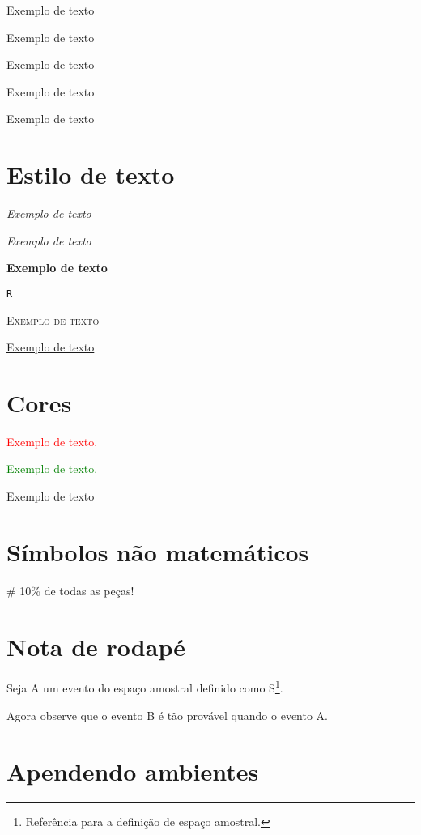 \documentclass{article}
\begin{document}
\tiny
Exemplo de texto

\footnotesize
Exemplo de texto

\Large
Exemplo de texto

\Huge
Exemplo de texto

\normalsize
Exemplo de texto


\section{Estilo de texto}


\emph{Exemplo de texto}

\textit{Exemplo de texto}

\textbf{Exemplo de texto}

\texttt{R}

\textsc{Exemplo de texto}

\uline{Exemplo de texto}


\section{Cores}


\textcolor{red}{Exemplo de texto.}

\textcolor{green}{Exemplo de texto.}

\textcolor{azulescuro}{Exemplo de texto}

\section{Símbolos não matemáticos}

\dag \# 10\% de todas as peças! 


\section{Nota de rodapé}

\hspace{1.5cm} Seja A um evento do espaço amostral definido como S\footnote{Referência para a definição de espaço amostral.}.

\vspace{1cm}

Agora observe que o evento B é tão provável quando o evento A.


\section{Apendendo ambientes}
\end{document}

